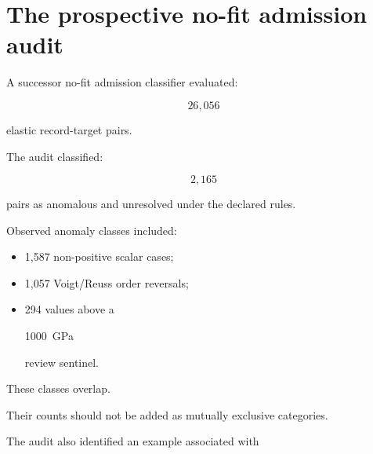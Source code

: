 \documentclass[11pt,a4paper,oneside]{report}
\begin{document}
\section{The prospective no-fit admission audit}



A successor no-fit admission classifier evaluated:



\begin{equation}
26{,}056
\end{equation}



elastic record-target pairs.



The audit classified:



\begin{equation}
2{,}165
\end{equation}



pairs as anomalous and unresolved under the declared rules.



Observed anomaly classes included:



\begin{itemize}



\item

1,587 non-positive scalar cases;



\item

1,057 Voigt/Reuss order reversals;



\item

294 values above a

\SI{1000}{\giga\pascal}

review sentinel.



\end{itemize}



These classes overlap.



Their counts should not be added as mutually exclusive categories.



The audit also identified an example associated with
\end{document}
